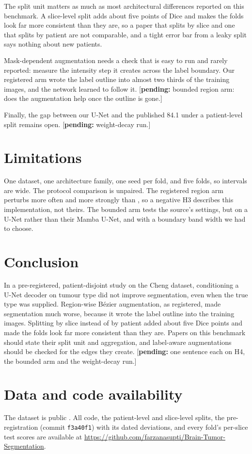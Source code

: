 \documentclass[11pt,a4paper]{article}
\newcommand{\pending}[1]{\textcolor{red!70!black}{[\textbf{pending:} #1]}}
\begin{document}
The split unit matters as much as most architectural differences reported on
this benchmark. A slice-level split adds about five points of Dice and makes the
folds look far more consistent than they are, so a paper that splits by slice
and one that splits by patient are not comparable, and a tight error bar from a
leaky split says nothing about new patients.

Mask-dependent augmentation needs a check that is easy to run and rarely
reported: measure the intensity step it creates across the label boundary. Our
registered arm wrote the label outline into almost two thirds of the training
images, and the network learned to follow it. \pending{bounded region arm: does
the augmentation help once the outline is gone.}

Finally, the gap between our U-Net and the published 84.1 under a
patient-level split remains open. \pending{weight-decay run.}

\section{Limitations}
One dataset, one architecture family, one seed per fold, and five folds, so
intervals are wide. The protocol comparison is unpaired. The registered region arm
perturbs more often and more strongly than \citet{yurdakul2026}, so a negative H3
describes this implementation, not theirs. The bounded arm tests the source's
settings, but on a U-Net rather than their Mamba U-Net, and with a boundary band
width we had to choose.

\section{Conclusion}
In a pre-registered, patient-disjoint study on the Cheng dataset, conditioning a
U-Net decoder on tumour type did not improve segmentation, even when the true
type was supplied. Region-wise B\'ezier augmentation, as registered, made
segmentation much worse, because it wrote the label outline into the training
images. Splitting by slice instead of by patient added about five Dice points and
made the folds look far more consistent than they are. Papers on this benchmark
should state their split unit and aggregation, and label-aware augmentations
should be checked for the edges they create. \pending{one sentence each on H4,
the bounded arm and the weight-decay run.}

\section*{Data and code availability}
The dataset is public \citep{chengdata}. All code, the patient-level and
slice-level splits, the pre-registration (commit \texttt{f3a40f1}) with its dated
deviations, and every fold's per-slice test scores are available at
\url{https://github.com/farzanasupti/Brain-Tumor-Segmentation}.
\end{document}
